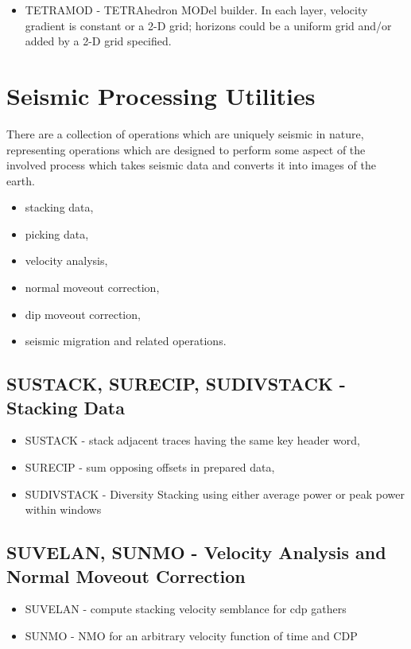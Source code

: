 {{{{{{{\begin{itemize}
\item TETRAMOD - TETRAhedron MODel builder. In each layer, velocity gradient
is constant or a 2-D grid; horizons could be a uniform grid and/or added by
a 2-D grid specified.
\end{itemize}


\chapter{Seismic Processing Utilities}
There are a collection of operations which are uniquely seismic
in nature, representing operations which are designed to
perform some aspect of the involved process which takes seismic
data and converts it into images of the earth.

\begin{itemize}
\item stacking data,
\item picking data,
\item velocity analysis,
\item normal moveout correction,
\item dip moveout correction,
\item seismic migration and related operations.
\end{itemize}

\section{SUSTACK, SURECIP, SUDIVSTACK - Stacking Data}
\begin{itemize}
\item SUSTACK - stack adjacent traces having the same key header word, 
\item SURECIP - sum opposing offsets in prepared data,
\item SUDIVSTACK -  Diversity Stacking using either average power or peak   
power within windows 
\end{itemize}

\section{SUVELAN, SUNMO - Velocity Analysis and Normal Moveout Correction}
\begin{itemize}
\item SUVELAN - compute stacking velocity semblance for cdp gathers
\item SUNMO - NMO for an arbitrary velocity function of time and CDP 
\end{itemize}

}}}}}}}
